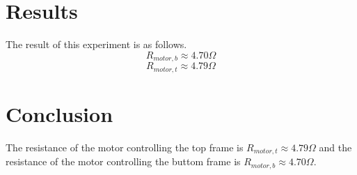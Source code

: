 \documentclass[../../rapport/main]{article}
\begin{document}
\newpage

\section{Results}

The result of this experiment is as follows.
$$R_{motor,b} \approx 4.70 \Omega$$
$$R_{motor,t} \approx 4.79 \Omega$$

\section{Conclusion}

The resistance of the motor controlling the top frame is $R_{motor,t}\approx 4.79 \Omega$ and the resistance of the motor controlling the buttom frame is $R_{motor,b}\approx 4.70 \Omega$.
\end{document}

